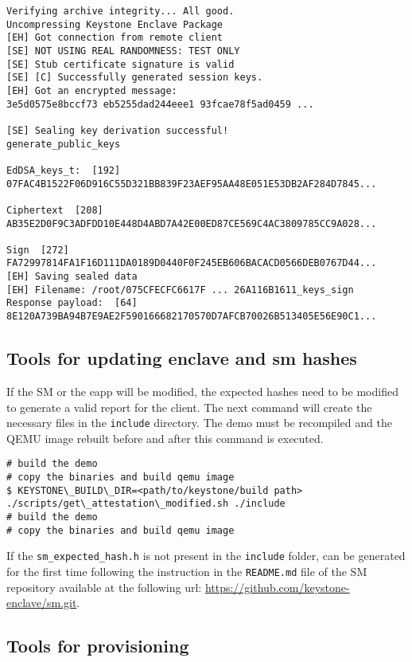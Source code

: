 \begin{lstlisting}[caption={Example of output at server side},captionpos=b,label={l-demo-s},style=DOS,frame=single]
Verifying archive integrity... All good.
Uncompressing Keystone Enclave Package
[EH] Got connection from remote client
[SE] NOT USING REAL RANDOMNESS: TEST ONLY
[SE] Stub certificate signature is valid
[SE] [C] Successfully generated session keys.
[EH] Got an encrypted message:
3e5d0575e8bccf73 eb5255dad244eee1 93fcae78f5ad0459 ...

[SE] Sealing key derivation successful!
generate_public_keys

EdDSA_keys_t:  [192]
07FAC4B1522F06D916C55D321BB839F23AEF95AA48E051E53DB2AF284D7845...

Ciphertext  [208]
AB35E2D0F9C3ADFDD10E448D4ABD7A42E00ED87CE569C4AC3809785CC9A028...

Sign  [272]
FA72997814FA1F16D111DA0189D0440F0F245EB606BACACD0566DEB0767D44...
[EH] Saving sealed data
[EH] Filename: /root/075CFECFC6617F ... 26A116B1611_keys_sign
Response payload:  [64]
8E120A739BA94B7E9AE2F590166682170570D7AFCB70026B513405E56E90C1...
\end{lstlisting}

\subsection{Tools for updating enclave and sm hashes}
If the SM or the eapp will be modified, the expected hashes need to be modified to generate a valid report for the client. The next command will create the necessary files in the \texttt{include} directory. The demo must be recompiled and the QEMU image rebuilt before and after this command is executed. 

\begin{lstlisting}[frame=single]
# build the demo
# copy the binaries and build qemu image
$ KEYSTONE\_BUILD\_DIR=<path/to/keystone/build path> ./scripts/get\_attestation\_modified.sh ./include
# build the demo
# copy the binaries and build qemu image
\end{lstlisting}

If the \texttt{sm\_expected\_hash.h} is not present in the \texttt{include} folder, can be generated for the first time following the instruction in the \texttt{README.md} file of the SM repository available at the following url: \url{https://github.com/keystone-enclave/sm.git}. 

\subsection{Tools for provisioning}

